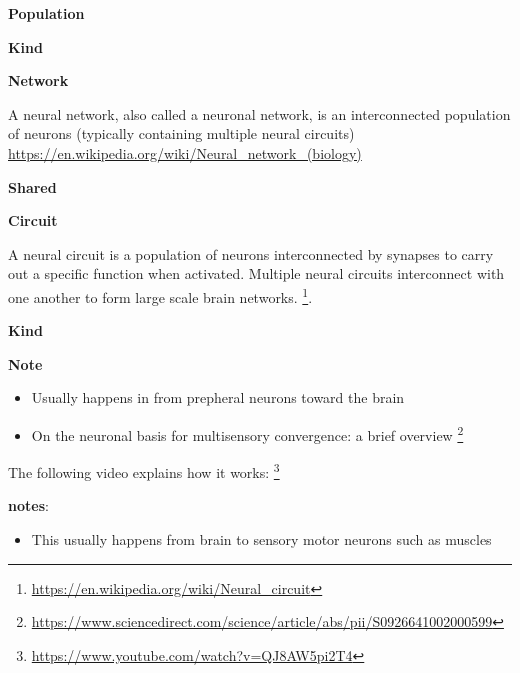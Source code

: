 \documentclass{book}
\providecommand{\ProjectDeepHeading}[2]{%
    \par\medskip\noindent\textbf{#2}\par\smallskip
}
\providecommand{\seeherefooter}[1]{\footnote{\url{#1}}}
\begin{document}
\ProjectDeepHeading{4}{Population}

\ProjectDeepHeading{5}{Kind}

\ProjectDeepHeading{6}{Network}


A neural network, also called a neuronal network, is an interconnected population of neurons (typically containing multiple neural circuits) \url{https://en.wikipedia.org/wiki/Neural_network_(biology)}

\ProjectDeepHeading{7}{Shared}

\ProjectDeepHeading{8}{Circuit}


A neural circuit is a population of neurons interconnected by synapses to carry out a specific function when activated. Multiple neural circuits interconnect with one another to form large scale brain networks. \seeherefooter{https://en.wikipedia.org/wiki/Neural_circuit}.

\ProjectDeepHeading{9}{Kind}


\textbf{Note}
    \begin{itemize}
        \item Usually happens in from prepheral neurons toward the brain
    \end{itemize}
    
    \begin{itemize}
        \item On the neuronal basis for multisensory convergence: a brief overview \seeherefooter{https://www.sciencedirect.com/science/article/abs/pii/S0926641002000599}
    \end{itemize}


The following video explains how it works:
    \seeherefooter{https://www.youtube.com/watch?v=QJ8AW5pi2T4}
    
    \textbf{notes}:
    \begin{itemize}
        \item This usually happens from brain to sensory motor neurons such as muscles
    \end{itemize}
\end{document}
